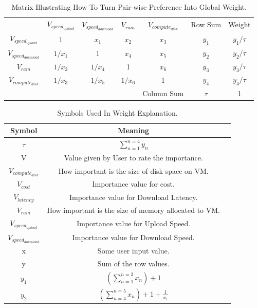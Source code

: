 \begin{table}[!ht]
\begin{center}
\caption{Matrix Illustrating How To Turn Pair-wise Preference Into Global Weight.}
\label{table:weight}
\begin{tabular}{ccccccc}
& $V_{speed_{upload}}$ & $V_{speed_{download}}$ & $V_{ram}$ & $V_{compute_{disk}}$ & Row Sum & Weight \\
$V_{speed_{upload}}$ & 1 & ${x_{1}}$ & ${x_{2}}$ & ${x_{3}}$ & ${y_{1}}$ & ${y_1}/\tau$  \\
$V_{speed_{download}}$ & $1/{x_1}$ & 1  & ${x_{4}}$ & ${x_{5}}$ & ${y_{2}}$ & ${y_2}/\tau$  \\
$V_{ram}$ & $1/{x_2}$ & $1/{x_4}$ & 1 & ${x_{6}}$ & ${y_{3}}$ & ${y_3}/\tau$ \\
$V_{compute_{disk}}$ & $1/{x_3}$ & $1/{x_5}$ & $1/{x_{6}}$ & 1 & ${y_{4}}$ & ${y_4}/\tau$ \\
& & & & Column Sum & $\tau$ & 1\\
\end{tabular}
\end{center}
\end{table}

\begin{table}[!ht]
\begin{center}\caption{Symbols Used In Weight Explanation.} \label{table:weight_explanation_symbols}
\begin{tabular}{|c|c|c|}
\hline
\textbf{Symbol }&  \textbf{Meaning } \\
\hline $\tau $ & $\sum\limits_{n = 1}^{n = 4} {{y_n}} $ \\
\hline V & Value given by User to rate the importance. \\
\hline $V_{compute_{disk}}$ & How important is the size of disk space on VM. \\
\hline $V_{cost}$ & Importance value for cost. \\
\hline ${V_{latency}}$ & Importance value for Download Latency. \\
\hline $V_{ram}$ & How important is the size of memory allocated to VM. \\
\hline $V_{speed_{upload}}$ & Importance value for Upload Speed. \\
\hline $V_{speed_{download}}$ & Importance value for Download Speed. \\
\hline x & Some user input value. \\
\hline y & Sum of the row values. \\
\hline ${y_1}$ & $\left( {\sum\limits_{n = 1}^{n = 3} {{x_n}} } \right) + 1$ \\
\hline ${y_2}$ & $\left( {\sum\limits_{n = 4}^{n = 5} {{x_n}} } \right) + 1 + \frac{1}{{{x_1}}}$\\
\hline
\end{tabular}
\end{center}
\end{table}

